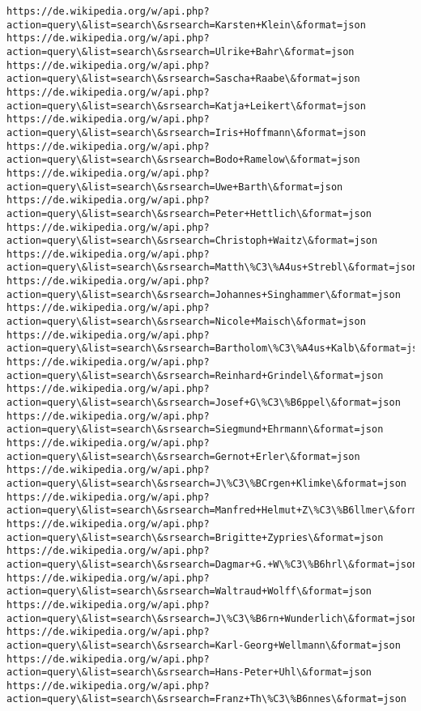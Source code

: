 \documentclass[11pt]{article}
\begin{document}
\begin{Verbatim}[commandchars=\\\{\}]
https://de.wikipedia.org/w/api.php?action=query\&list=search\&srsearch=Karsten+Klein\&format=json
https://de.wikipedia.org/w/api.php?action=query\&list=search\&srsearch=Ulrike+Bahr\&format=json
https://de.wikipedia.org/w/api.php?action=query\&list=search\&srsearch=Sascha+Raabe\&format=json
https://de.wikipedia.org/w/api.php?action=query\&list=search\&srsearch=Katja+Leikert\&format=json
https://de.wikipedia.org/w/api.php?action=query\&list=search\&srsearch=Iris+Hoffmann\&format=json
https://de.wikipedia.org/w/api.php?action=query\&list=search\&srsearch=Bodo+Ramelow\&format=json
https://de.wikipedia.org/w/api.php?action=query\&list=search\&srsearch=Uwe+Barth\&format=json
https://de.wikipedia.org/w/api.php?action=query\&list=search\&srsearch=Peter+Hettlich\&format=json
https://de.wikipedia.org/w/api.php?action=query\&list=search\&srsearch=Christoph+Waitz\&format=json
https://de.wikipedia.org/w/api.php?action=query\&list=search\&srsearch=Matth\%C3\%A4us+Strebl\&format=json
https://de.wikipedia.org/w/api.php?action=query\&list=search\&srsearch=Johannes+Singhammer\&format=json
https://de.wikipedia.org/w/api.php?action=query\&list=search\&srsearch=Nicole+Maisch\&format=json
https://de.wikipedia.org/w/api.php?action=query\&list=search\&srsearch=Bartholom\%C3\%A4us+Kalb\&format=json
https://de.wikipedia.org/w/api.php?action=query\&list=search\&srsearch=Reinhard+Grindel\&format=json
https://de.wikipedia.org/w/api.php?action=query\&list=search\&srsearch=Josef+G\%C3\%B6ppel\&format=json
https://de.wikipedia.org/w/api.php?action=query\&list=search\&srsearch=Siegmund+Ehrmann\&format=json
https://de.wikipedia.org/w/api.php?action=query\&list=search\&srsearch=Gernot+Erler\&format=json
https://de.wikipedia.org/w/api.php?action=query\&list=search\&srsearch=J\%C3\%BCrgen+Klimke\&format=json
https://de.wikipedia.org/w/api.php?action=query\&list=search\&srsearch=Manfred+Helmut+Z\%C3\%B6llmer\&format=json
https://de.wikipedia.org/w/api.php?action=query\&list=search\&srsearch=Brigitte+Zypries\&format=json
https://de.wikipedia.org/w/api.php?action=query\&list=search\&srsearch=Dagmar+G.+W\%C3\%B6hrl\&format=json
https://de.wikipedia.org/w/api.php?action=query\&list=search\&srsearch=Waltraud+Wolff\&format=json
https://de.wikipedia.org/w/api.php?action=query\&list=search\&srsearch=J\%C3\%B6rn+Wunderlich\&format=json
https://de.wikipedia.org/w/api.php?action=query\&list=search\&srsearch=Karl-Georg+Wellmann\&format=json
https://de.wikipedia.org/w/api.php?action=query\&list=search\&srsearch=Hans-Peter+Uhl\&format=json
https://de.wikipedia.org/w/api.php?action=query\&list=search\&srsearch=Franz+Th\%C3\%B6nnes\&format=json

\end{Verbatim}
\end{document}
